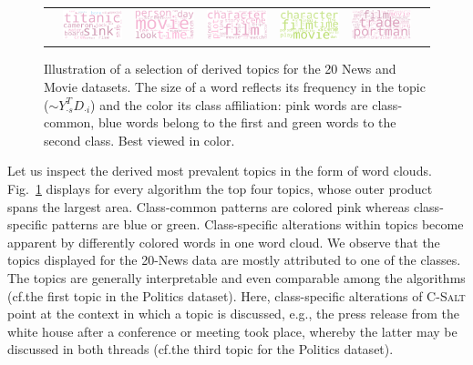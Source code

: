 \begin{figure}[!t]
\begin{tabular}{ccc@{\hskip 0.1in}cc@{\hskip 0.1in}cc}
    & \includegraphics[width=0.14\columnwidth]{pics/Wordclouds/MoviePunk_3}
    &  \includegraphics[width=0.14\columnwidth]{pics/Wordclouds/MoviePrimp_3}
    & \includegraphics[width=0.14\columnwidth]{pics/Wordclouds/MoviePrimp_4}
    &  \includegraphics[width=0.14\columnwidth]{pics/Wordclouds/MovieDBSSL_3}
    &  \includegraphics[width=0.14\columnwidth]{pics/Wordclouds/MovieDBSSL_4}
  \end{tabular}
  \caption{Illustration of a selection of derived topics for the 20 News and Movie datasets. The size of a word reflects its frequency in the topic ($\sim Y_{\cdot s}^TD_{\cdot i}$) and the color its class affiliation: pink words are class-common, blue words belong to the first and green words to the second class. Best viewed in color.\label{fig:topics}}
\end{figure}
Let us inspect the derived most prevalent topics in the form of word clouds.
Fig.~\ref{fig:topics} displays for every algorithm the top four topics, whose outer product spans the largest area. Class-common patterns are colored pink whereas class-specific patterns are blue or green. Class-specific alterations within topics become apparent by differently colored words in one word cloud. We observe that the topics displayed for the 20-News data are mostly attributed to one of the classes. The topics are generally interpretable and even comparable among the algorithms (cf.\@ the first topic in the Politics dataset). Here, class-specific alterations of \textsc{C-Salt} point at the context in which a topic is discussed, e.g., the press release from the white house after a conference or meeting took place, whereby the latter may be discussed in both threads (cf.\@ the third topic for the Politics dataset).

